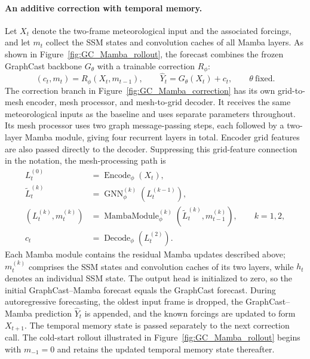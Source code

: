\documentclass{article}
\begin{document}
\paragraph{An additive correction with temporal memory.}
Let $X_t$ denote the two-frame meteorological input and the associated forcings, and let $m_t$ collect the SSM states and convolution caches of all Mamba layers. As shown in Figure~\ref{fig:GC_Mamba_rollout}, the forecast combines the frozen GraphCast backbone $G_\theta$ with a trainable correction $R_\phi$:
\begin{equation}
    (c_t,m_t)=R_\phi(X_t,m_{t-1}),
    \qquad
    \hat{Y}_t=G_\theta(X_t)+c_t,
    \qquad \theta\ \text{fixed}.
    \label{eq:additive_correction}
\end{equation}
The correction branch in Figure~\ref{fig:GC_Mamba_correction} has its own grid-to-mesh encoder, mesh processor, and mesh-to-grid decoder. It receives the same meteorological inputs as the baseline and uses separate parameters throughout. Its mesh processor uses two graph message-passing steps, each followed by a two-layer Mamba module, giving four recurrent layers in total. Encoder grid features are also passed directly to the decoder. Suppressing this grid-feature connection in the notation, the mesh-processing path is
\begin{align}
    L_t^{(0)} &= \operatorname{Encode}_\phi(X_t),\\
    \widetilde{L}_t^{(k)} &= \operatorname{GNN}^{(k)}_\phi(L_t^{(k-1)}),\\
    (L_t^{(k)},m_t^{(k)})
    &=\operatorname{MambaModule}^{(k)}_\phi
       (\widetilde{L}_t^{(k)},m_{t-1}^{(k)}),\qquad k=1,2,\\
    c_t &= \operatorname{Decode}_\phi(L_t^{(2)}).
\end{align}
Each Mamba module contains the residual Mamba updates described above; $m_t^{(k)}$ comprises the SSM states and convolution caches of its two layers, while $h_t$ denotes an individual SSM state. The output head is initialized to zero, so the initial GraphCast--Mamba forecast equals the GraphCast forecast. During autoregressive forecasting, the oldest input frame is dropped, the GraphCast--Mamba prediction $\hat{Y}_t$ is appended, and the known forcings are updated to form $X_{t+1}$. The temporal memory state is passed separately to the next correction call. The cold-start rollout illustrated in Figure~\ref{fig:GC_Mamba_rollout} begins with $m_{-1}=0$ and retains the updated temporal memory state thereafter.
\end{document}
